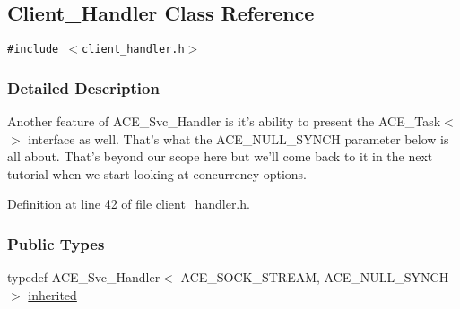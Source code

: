 \hypertarget{classClient__Handler}{
\subsection{Client\_\-Handler Class Reference}
\label{classClient__Handler}
}
{\tt \#include $<$client\_\-handler.h$>$}



\subsubsection{Detailed Description}
Another feature of ACE\_\-Svc\_\-Handler is it's ability to present the ACE\_\-Task$<$$>$ interface as well. That's what the ACE\_\-NULL\_\-SYNCH parameter below is all about. That's beyond our scope here but we'll come back to it in the next tutorial when we start looking at concurrency options. 



Definition at line 42 of file client\_\-handler.h.\subsubsection*{Public Types}
\begin{CompactItemize}
\item 
typedef ACE\_\-Svc\_\-Handler$<$ ACE\_\-SOCK\_\-STREAM, ACE\_\-NULL\_\-SYNCH $>$ \hyperlink{classClient__Handler_Client__Handlers0}{inherited}
\end{CompactItemize}
